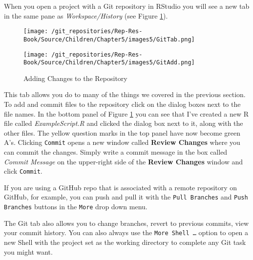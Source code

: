 When you open a project with a Git repository in RStudio you will see a new tab in the same pane as \emph{Workspace/History} (see Figure \ref{GitTab}).

\begin{figure}
    \caption{The RStudio Git Tab}
    \label{GitTab}
    \begin{center}

    \begin{subfigure}
        \caption{ExampleProject Git Tab}
            \texttt{[image: /git\_repositories/Rep-Res-Book/Source/Children/Chapter5/images5/GitTab.png]}
    \end{subfigure}
    \vspace{0.25cm}

    \begin{subfigure}
        \caption{Adding Changes to the Repository}
            \texttt{[image: /git\_repositories/Rep-Res-Book/Source/Children/Chapter5/images5/GitAdd.png]}
    \end{subfigure}
    \end{center}
\end{figure}

This tab allows you do to many of the things we covered in the previous section. To add and commit files to the repository click on the dialog boxes next to the file names. In the bottom panel of Figure \ref{GitTab} you can see that I've created a new R file called \emph{ExampleScript.R} and clicked the dialog box next to it, along with the other files. The yellow question marks in the top panel have now become green A's. Clicking \texttt{Commit} opens a new window called \textbf{Review Changes} where you can commit the changes. Simply write a commit message in the box called \emph{Commit Message} on the upper-right side of the \textbf{Review Changes} window and click \texttt{Commit}.  

If you are using a GitHub repo that is associated with a remote repository on GitHub, for example, you can push and pull it with the \texttt{Pull Branches} and \texttt{Push Branches} buttons in the \texttt{More} drop down menu.

The Git tab also allows you to change branches, revert to previous commits, view your commit history. You can also always use the \texttt{More \textrightarrow\:Shell \ldots} option to open a new Shell with the project set as the working directory to complete any Git task you might want.

